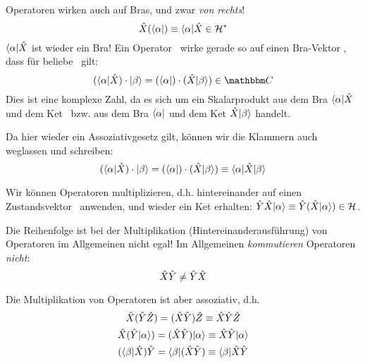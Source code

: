 \begin{post}
Operatoren wirken auch auf Bras, und zwar \emph{von rechts}!
\begin{equation}
\opx(\braa) \equiv \braa \opx \in \ds
\end{equation} 
$\braa\opx$ ist wieder ein Bra! Ein Operator \opx\ wirke gerade so auf einen Bra-Vektor \braa, dass f\"ur beliebe \ketb\ gilt:
 \begin{equation}
  (\braa \opx) \cdot \ketb = (\braa) \cdot (\opx \ketb) \in \comps
 \end{equation}
 Dies ist eine komplexe Zahl, da es sich um ein Skalarprodukt aus dem Bra $\braa\opx$ und dem Ket \ketb\ bzw. aus dem Bra $\braa$ und dem Ket $\opx\ketb$ handelt.
\end{post}
\begin{konv}
 Da hier wieder ein Assoziativgesetz gilt, k\"onnen wir die Klammern auch weglassen und schreiben:
 \begin{equation}
  (\braa \opx) \cdot \ketb = (\braa) \cdot (\opx \ketb) \equiv \braa \opx \ketb
 \end{equation}
\end{konv}

\begin{eig}
 Wir k\"onnen Operatoren multiplizieren, d.h. hintereinander auf einen Zustandsvektor \keta\ anwenden, und wieder ein Ket erhalten: $\opy \opx \keta \equiv \opy ( \opx \keta) \in \hs$.
\end{eig}

\begin{eig}
 Die Reihenfolge ist bei der Multiplikation (Hintereinanderausf\"uhrung) von Operatoren im Allgemeinen nicht egal! Im Allgemeinen \emph{kommutieren} Operatoren \emph{nicht}:
 \begin{equation}
  \hat{X} \hat{Y} \neq \hat{Y} \hat{X}
 \end{equation}
\end{eig}
\begin{eig}
 Die Multiplikation von Operatoren ist aber assoziativ, d.h.
 \begin{gather}
  \opx (\opy \op{Z}) = (\opx \opy) \op{Z} \equiv \opx \opy \op{Z} \\
  \opx(\opy \keta) = (\opx \opy) \keta \equiv \opx \opy \keta \\
  (\brab \opx) \opy = \brab (\opx \opy)\equiv \brab \opx \opy
 \end{gather}

\end{eig}

